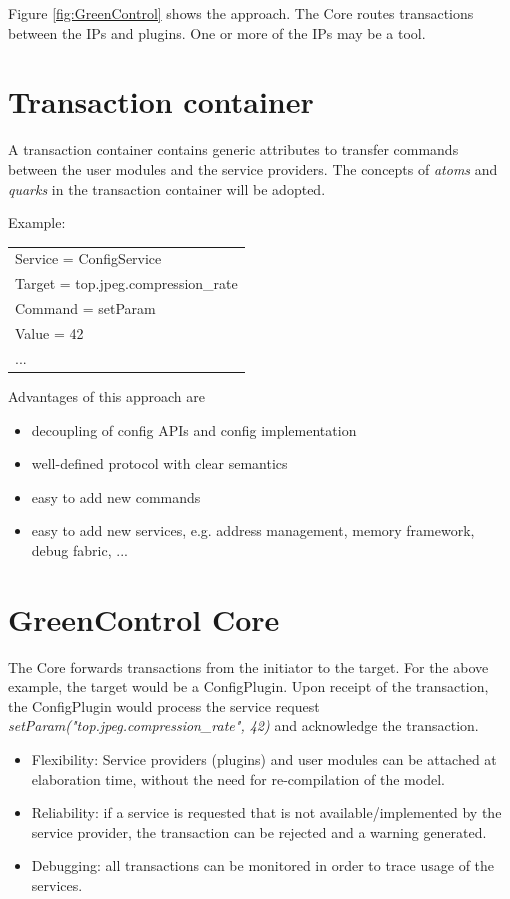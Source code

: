 Figure \ref{fig:GreenControl} shows the approach. The \GreenControl Core routes transactions between the IPs and plugins. One or more of the IPs may be a tool.



\section{Transaction container}
A transaction container contains generic attributes to transfer commands between the user modules and the service providers. The concepts of {\em atoms} and {\em quarks} in the \GreenBus transaction container will be adopted. 

Example: 

\begin{tabular}{|l|}
	\cline{1-1} Service = ConfigService   \\ 
	\cline{1-1} Target = top.jpeg.compression\_rate   \\ 
	\cline{1-1} Command = setParam   \\ 
	\cline{1-1} Value = 42   \\ 
	\cline{1-1} ...   \\ 
	\hline
\end{tabular}

Advantages of this approach are 
\begin{itemize}
	\item decoupling of config APIs and config implementation 
	\item well-defined protocol with clear semantics 
	\item easy to add new commands 
	\item easy to add new services, e.g. address management, memory framework, debug fabric, ... 
\end{itemize}


\section{GreenControl Core}
The Core forwards transactions from the initiator to the target. For the above example, the target would be a ConfigPlugin. Upon receipt of the transaction, the ConfigPlugin would process the service request {\em setParam("top.jpeg.compression\_rate", 42)} and acknowledge the transaction. 

\begin{itemize}
	\item Flexibility: Service providers (plugins) and user modules can be attached at elaboration time, without the need for re-compilation of the model. 
	\item Reliability: if a service is requested that is not available/implemented by the service provider, the transaction can be rejected and a warning generated.
	\item Debugging: all transactions can be monitored in order to trace usage of the \GreenControl services.
\end{itemize}



